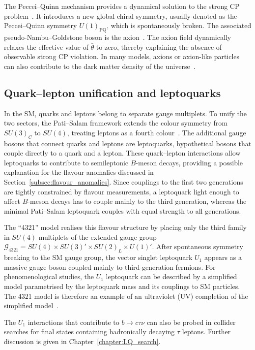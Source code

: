 The Peccei--Quinn mechanism provides a dynamical solution to the strong CP problem~\cite{PecceiQuinn1977PRL,PecceiQuinn1977PRD}. 
It introduces a new global chiral symmetry, usually denoted as the Peccei--Quinn symmetry $U(1)_{\mathrm{PQ}}$, which is spontaneously broken.
The associated pseudo-Nambu--Goldstone boson is the axion~\cite{Weinberg1978Axion,Wilczek1978Axion}. 
The axion field dynamically relaxes the effective value of $\bar{\theta}$ to zero, thereby explaining the absence of observable strong CP violation. 
In many models, axions or axion-like particles can also contribute to the dark matter density of the universe~\cite{KimCarosi2010}.

\subsection{Quark--lepton unification and leptoquarks}
\label{subsec:leptoquarks_motivation}

In the SM, quarks and leptons belong to separate gauge multiplets.
To unify the two sectors, the Pati--Salam framework extends the colour symmetry from $SU(3)_C$ to $SU(4)$, treating leptons as a fourth colour~\cite{PatiSalam1974}.
The additional gauge bosons that connect quarks and leptons are leptoquarks, hypothetical bosons that couple directly to a quark and a lepton.
These quark--lepton interactions allow leptoquarks to contribute to semileptonic $B$-meson decays, providing a possible explanation for the flavour anomalies discussed in Section~\ref{subsec:flavour_anomalies}.
Since couplings to the first two generations are tightly constrained by flavour measurements, a leptoquark light enough to affect $B$-meson decays has to couple mainly to the third generation, whereas the minimal Pati--Salam leptoquark couples with equal strength to all generations.

The ``4321'' model realises this flavour structure by placing only the third family in $SU(4)$ multiplets of the extended gauge group $\mathcal{G}_{4321}=SU(4)\times SU(3)'\times SU(2)_L \times U(1)'$.
After spontaneous symmetry breaking to the SM gauge group, the vector singlet leptoquark $U_{1}$ appears as a massive gauge boson coupled mainly to third-generation fermions.
For phenomenological studies, the $U_1$ leptoquark can be described by a simplified model parametrised by the leptoquark mass and its couplings to SM particles.
The 4321 model is therefore an example of an ultraviolet (UV) completion of the simplified model~\cite{Cornella2019}.

The $U_1$ interactions that contribute to $b\rightarrow c\tau\nu$ can also be probed in collider searches for final states containing hadronically decaying $\tau$ leptons.
Further discussion is given in Chapter~\ref{chapter:LQ_search}.
